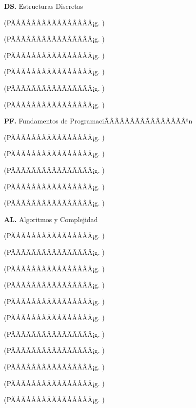 	\textbf{DS.}  Estructuras Discretas%
	\begin{list}{}{%
		\setlength{\labelwidth}{0pt}%
		\setlength{\leftmargin}{15pt}}%
		\item \DSUNODef(PÃÂÃÂÃÂÃÂÃÂÃÂÃÂÃÂ¡g. \pageref{sec:BOK-DS1})
		\item \DSDOSDef(PÃÂÃÂÃÂÃÂÃÂÃÂÃÂÃÂ¡g. \pageref{sec:BOK-DS2})
		\item \DSTRESDef(PÃÂÃÂÃÂÃÂÃÂÃÂÃÂÃÂ¡g. \pageref{sec:BOK-DS3})
		\item \DSCUATRODef(PÃÂÃÂÃÂÃÂÃÂÃÂÃÂÃÂ¡g. \pageref{sec:BOK-DS4})
		\item \DSCINCODef(PÃÂÃÂÃÂÃÂÃÂÃÂÃÂÃÂ¡g. \pageref{sec:BOK-DS5})
		\item \DSSEISDef(PÃÂÃÂÃÂÃÂÃÂÃÂÃÂÃÂ¡g. \pageref{sec:BOK-DS6})
	\end{list}%
	\textbf{PF.}  Fundamentos de ProgramaciÃÂÃÂÃÂÃÂÃÂÃÂÃÂÃÂ³n%
	\begin{list}{}{%
		\setlength{\labelwidth}{0pt}%
		\setlength{\leftmargin}{15pt}}%
		\item \PFUNODef(PÃÂÃÂÃÂÃÂÃÂÃÂÃÂÃÂ¡g. \pageref{sec:BOK-PF1})
		\item \PFDOSDef(PÃÂÃÂÃÂÃÂÃÂÃÂÃÂÃÂ¡g. \pageref{sec:BOK-PF2})
		\item \PFTRESDef(PÃÂÃÂÃÂÃÂÃÂÃÂÃÂÃÂ¡g. \pageref{sec:BOK-PF3})
		\item \PFCUATRODef(PÃÂÃÂÃÂÃÂÃÂÃÂÃÂÃÂ¡g. \pageref{sec:BOK-PF4})
		\item \PFCINCODef(PÃÂÃÂÃÂÃÂÃÂÃÂÃÂÃÂ¡g. \pageref{sec:BOK-PF5})
	\end{list}%
	\textbf{AL.}  Algoritmos y Complejidad%
	\begin{list}{}{%
		\setlength{\labelwidth}{0pt}%
		\setlength{\leftmargin}{15pt}}%
		\item \ALUNODef(PÃÂÃÂÃÂÃÂÃÂÃÂÃÂÃÂ¡g. \pageref{sec:BOK-AL1})
		\item \ALDOSDef(PÃÂÃÂÃÂÃÂÃÂÃÂÃÂÃÂ¡g. \pageref{sec:BOK-AL2})
		\item \ALTRESDef(PÃÂÃÂÃÂÃÂÃÂÃÂÃÂÃÂ¡g. \pageref{sec:BOK-AL3})
		\item \ALCUATRODef(PÃÂÃÂÃÂÃÂÃÂÃÂÃÂÃÂ¡g. \pageref{sec:BOK-AL4})
		\item \ALCINCODef(PÃÂÃÂÃÂÃÂÃÂÃÂÃÂÃÂ¡g. \pageref{sec:BOK-AL5})
		\item \ALSEISDef(PÃÂÃÂÃÂÃÂÃÂÃÂÃÂÃÂ¡g. \pageref{sec:BOK-AL6})
		\item \ALSIETEDef(PÃÂÃÂÃÂÃÂÃÂÃÂÃÂÃÂ¡g. \pageref{sec:BOK-AL7})
		\item \ALOCHODef(PÃÂÃÂÃÂÃÂÃÂÃÂÃÂÃÂ¡g. \pageref{sec:BOK-AL8})
		\item \ALNUEVEDef(PÃÂÃÂÃÂÃÂÃÂÃÂÃÂÃÂ¡g. \pageref{sec:BOK-AL9})
		\item \ALDIEZDef(PÃÂÃÂÃÂÃÂÃÂÃÂÃÂÃÂ¡g. \pageref{sec:BOK-AL10})
		\item \ALONCEDef(PÃÂÃÂÃÂÃÂÃÂÃÂÃÂÃÂ¡g. \pageref{sec:BOK-AL11})
	\end{list}%
